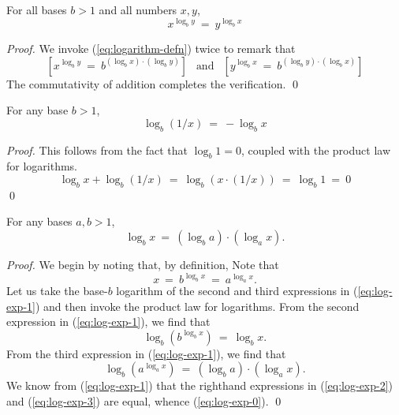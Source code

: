 \begin{prop}
For all bases $b > 1$ and all numbers $x, y$,
\[ x^{\log_b y} \ = \ y^{\log_b x} \]
\end{prop}

\begin{proof}
We invoke (\ref{eq:logarithm-defn}) twice to remark that
\[ \left[x^{\log_b y} \ = \ b^{(\log_b x) \cdot (\log_b y)}\right]
\ \ \mbox{ and } \ \ 
\left[y^{\log_b x}\ = \ b^{(\log_b y) \cdot (\log_b x)}\right] \]
The commutativity of addition completes the verification.  \qed
\end{proof}

\begin{prop}
For any base $b >1$,
\[ \log_b (1/x) \ = \ - \log_b x \]
\end{prop}

\begin{proof}
This follows from the fact that $\log_b 1 =0$, coupled with the
product law for logarithms.
\[ \log_b x + \log_b (1/x) \ = \ \log_b (x \cdot (1/x))
\  = \ \log_b 1 \ = \ 0 
\]
\qed
\end{proof}

\begin{prop}
For any bases $a, b >1$,
\begin{equation}
\label{eq:log-exp-0}
\log_b x \ = \ \left(\log_b a \right) \cdot \left( \log_a x \right).
\end{equation}
\end{prop}

\begin{proof}
We begin by noting that, by definition,
Note that
\begin{equation}
\label{eq:log-exp-1}
 x \ = \ b^{\log_b x} \ = \ a^{\log_a x} .
\end{equation}
Let us take the base-$b$ logarithm of the second and third expressions
in (\ref{eq:log-exp-1}) and then invoke the product law for logarithms.
From the second expression in (\ref{eq:log-exp-1}), we find that
\begin{equation}
\label{eq:log-exp-2}
 \log_b \left(b^{\log_b x} \right) \ = \ \log_b x .
\end{equation}
From the third expression in (\ref{eq:log-exp-1}), we find that
\begin{equation}
\label{eq:log-exp-3}
 \log_b \left( a^{\log_a x} \right) \ = \
\left(\log_b a \right) \cdot \left( \log_a x \right).
\end{equation}
We know from (\ref{eq:log-exp-1}) that the righthand expressions in
(\ref{eq:log-exp-2}) and (\ref{eq:log-exp-3}) are equal, whence
(\ref{eq:log-exp-0}).   \qed
\end{proof}

